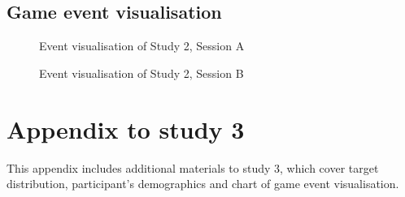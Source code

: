 \section{Game event visualisation}\label{app:vis2}
\begin{figure}[H]
  \centering
  \caption{Event visualisation of Study 2, Session A}
  
\end{figure}

\begin{figure}[H]
  \centering
  \caption{Event visualisation of Study 2, Session B}
 
\end{figure}

\chapter{Appendix to study 3}
This appendix includes additional materials to study 3, which cover target distribution, participant's demographics and chart of game event visualisation.

